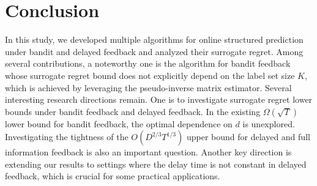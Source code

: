 \section{Conclusion}
In this study, we developed multiple algorithms for online structured prediction  
under bandit and delayed feedback and analyzed their surrogate regret. 
Among several contributions, a noteworthy one is the algorithm for bandit feedback whose surrogate regret bound does not explicitly depend on the label set size $K$, which is achieved by leveraging the pseudo-inverse matrix estimator.  
Several interesting research directions remain.  
One is to investigate surrogate regret lower bounds under bandit feedback and delayed feedback. 
In the existing $\Omega(\sqrt{T})$ lower bound for bandit feedback, the optimal dependence on $d$ is unexplored.  
Investigating the tightness of the $O(D^{2/3} T^{1/3})$ upper bound for delayed and full information feedback is also an important question.  
Another key direction is extending our results to settings  
where the delay time is not constant in delayed feedback,  
which is crucial for some practical applications.

